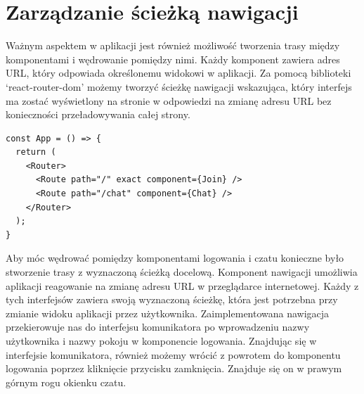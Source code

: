 \section{Zarządzanie ścieżką nawigacji}
Ważnym aspektem w aplikacji jest również możliwość tworzenia trasy między komponentami i wędrowanie pomiędzy nimi. Każdy komponent zawiera adres URL, który odpowiada określonemu widokowi w aplikacji. Za pomocą biblioteki ‘react-router-dom’ możemy tworzyć ścieżkę nawigacji wskazująca, który interfejs ma zostać wyświetlony na stronie w odpowiedzi na zmianę adresu URL bez konieczności przeładowywania całej strony.
\begin{lstlisting}[caption=Implementacja sciezki nawigacji pomiedzy interfejsami]
const App = () => {
  return (
    <Router>
      <Route path="/" exact component={Join} />
      <Route path="/chat" component={Chat} />
    </Router>
  );
}
\end{lstlisting}
Aby móc wędrować pomiędzy komponentami logowania i czatu konieczne było stworzenie trasy z wyznaczoną ścieżką docelową. Komponent nawigacji umożliwia aplikacji reagowanie na zmianę adresu URL w przeglądarce internetowej. Każdy z tych interfejsów zawiera swoją wyznaczoną ścieżkę, która jest potrzebna przy zmianie widoku aplikacji przez użytkownika. Zaimplementowana nawigacja przekierowuje nas do interfejsu komunikatora po wprowadzeniu nazwy użytkownika i nazwy pokoju w komponencie logowania. Znajdując się w interfejsie komunikatora, również możemy wrócić z powrotem do komponentu logowania poprzez kliknięcie przycisku zamknięcia. Znajduje się on w prawym górnym rogu okienku czatu.
